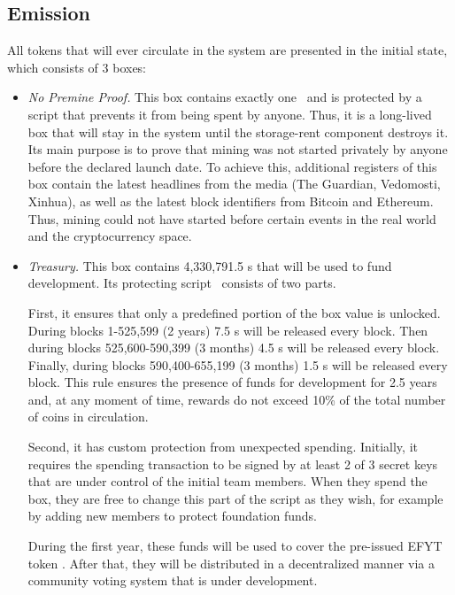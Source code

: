 \subsection{Emission}
\label{sec:emission}


All \Erg{} tokens that will ever circulate in the system are presented in the initial state, which consists of 3 boxes:

\begin{itemize}
    \item{\em No Premine Proof.} This box contains exactly one~\Erg{} and is protected by a script that prevents it from being spent by anyone.
    Thus, it is a long-lived box that will stay in the system until the storage-rent component
    destroys it.
    Its main purpose is to prove that \Ergo{} mining was not started privately by anyone before
    the declared launch date.
    To achieve this, additional registers of this box contain the latest headlines from the media (The Guardian, Vedomosti, Xinhua), as well as the latest block identifiers from Bitcoin and Ethereum.
    Thus, \Ergo{} mining could not have started before certain events in the real world and the cryptocurrency space.

    \item{\em Treasury.} This box contains 4,330,791.5 \Erg{}s that will be used to fund \Ergo{}
    development.
    Its protecting script~\cite{scriptTreasury} consists of two parts.

    First, it ensures that only a predefined portion of the box value is unlocked.
    During blocks 1-525,599 (2 years) 7.5 \Erg{}s will be released every block. Then during blocks 525,600-590,399 (3 months) 4.5 \Erg{}s will be released every block. Finally,
    during blocks 590,400-655,199 (3 months) 1.5 \Erg{}s will be released every block.
    This rule ensures the presence of funds for \Ergo{} development for 2.5 years and, at any moment of time,
    rewards do not exceed 10\% of the total number of coins in circulation.

    Second, it has custom protection from unexpected spending.
    Initially, it requires the spending transaction to be signed by at least 2 of 3 secret keys that are under control of the initial team members. When they spend the box, they are free to
    change this part of the script as they wish, for example by adding new members to protect foundation
    funds.

    During the first year, these funds will be used to cover the pre-issued EFYT token%
. After that, they will be distributed in a decentralized manner via a community voting system that is under development.



\end{itemize}
